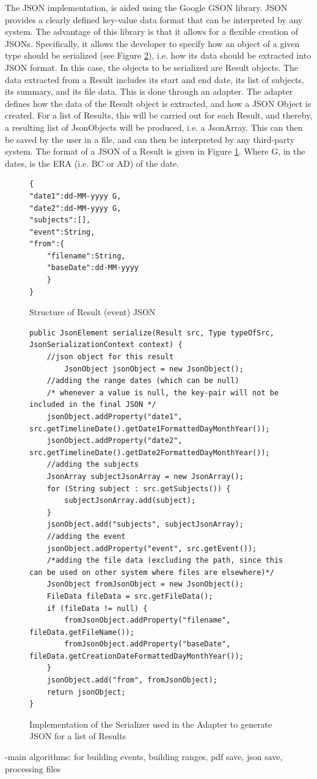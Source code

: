 \par The JSON implementation, is aided using the Google GSON library. JSON provides a clearly defined key-value data format that can be interpreted by any system. The advantage of this library is that it allows for a flexible creation of JSONs. Specifically, it allows the developer to specify how an object of a given type should be serialized (see Figure \ref{fig:adapterGsonImplemented}), i.e. how its data should be extracted into JSON format. In this case, the objects to be serialized are Result objects. The data extracted from a Result includes its start and end date, its list of subjects, its summary, and its file data. This is done through an adapter. The adapter defines how the data of the Result object is extracted, and how a JSON Object is created. For a list of Results, this will be carried out for each Result, and thereby, a resulting list of JsonObjects will be produced, i.e. a JsonArray. This can then be saved by the user in a file, and can then be interpreted by any third-party system. The format of a JSON of a Result is given in Figure \ref{fig:jsonResult}. Where G, in the dates, is the ERA (i.e. BC or AD) of the date.

\begin{figure}[h]
\begin{lstlisting}
{
"date1":dd-MM-yyyy G,
"date2":dd-MM-yyyy G,
"subjects":[],
"event":String,
"from":{
	"filename":String,
	"baseDate":dd-MM-yyyy
	}
}
\end{lstlisting}
\caption{Structure of Result (event) JSON}
\label{fig:jsonResult}
\end{figure}
\begin{figure}[H]
\begin{lstlisting}
public JsonElement serialize(Result src, Type typeOfSrc, JsonSerializationContext context) {
	//json object for this result
    	JsonObject jsonObject = new JsonObject();
	//adding the range dates (which can be null)
	/* whenever a value is null, the key-pair will not be included in the final JSON */
	jsonObject.addProperty("date1", src.getTimelineDate().getDate1FormattedDayMonthYear());
	jsonObject.addProperty("date2", src.getTimelineDate().getDate2FormattedDayMonthYear());
	//adding the subjects
	JsonArray subjectJsonArray = new JsonArray();
	for (String subject : src.getSubjects()) {
		subjectJsonArray.add(subject);
	}
	jsonObject.add("subjects", subjectJsonArray);
	//adding the event
	jsonObject.addProperty("event", src.getEvent());
	/*adding the file data (excluding the path, since this can be used on other system where files are elsewhere)*/
	JsonObject fromJsonObject = new JsonObject();
	FileData fileData = src.getFileData();
	if (fileData != null) {
		fromJsonObject.addProperty("filename", fileData.getFileName());
		fromJsonObject.addProperty("baseDate", fileData.getCreationDateFormattedDayMonthYear());
	}
	jsonObject.add("from", fromJsonObject);
	return jsonObject;
}
\end{lstlisting}
\caption{Implementation of the Serializer used in the Adapter to generate JSON for a list of Results}
\label{fig:adapterGsonImplemented}
\end{figure}

-main algorithms: for building events, building ranges, pdf save, json save, processing files
